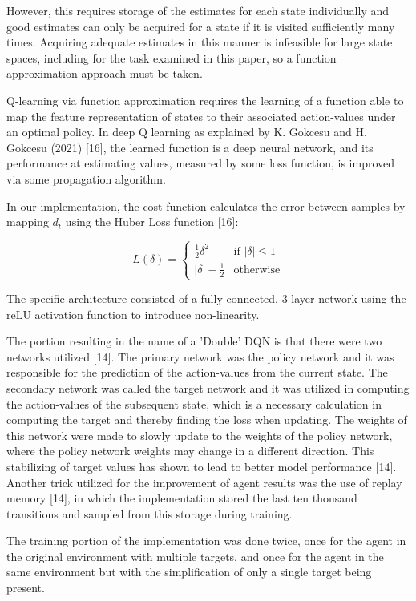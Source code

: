 \documentclass{article}
\begin{document}
	However, this requires storage of the estimates for each state individually and good estimates can only be acquired for a state if it is visited sufficiently many times. Acquiring adequate estimates in this manner is infeasible for large state spaces, including for the task examined in this paper, so a function approximation approach must be taken.
	
	Q-learning via function approximation requires the learning of a function able to map the feature representation of states to their associated action-values under an optimal policy. In deep Q learning as explained by K. Gokcesu and H. Gokcesu (2021) [16], the learned function is a deep neural network, and its performance at estimating values, measured by some loss function, is improved via some propagation algorithm.
	
	In our implementation, the cost function calculates the error between samples by mapping $d_{t}$ using the Huber Loss function [16]:
	
	\begin{equation}
		L(\delta)=
		\begin{cases}
			\frac{1}{2}\delta^{2} & \text{if  } |\delta| \leq 1\\
			|\delta| - \frac{1}{2} & \text{otherwise} 
		\end{cases}
	\end{equation}
	
	The specific architecture consisted of a fully connected, 3-layer network using the reLU activation function to introduce non-linearity.
	
	The portion resulting in the name of a 'Double' DQN is that there were two networks utilized [14]. The primary network was the policy network and it was responsible for the prediction of the action-values from the current state. The secondary network was called the target network and it was utilized in computing the action-values of the subsequent state, which is a necessary calculation in computing the target and thereby finding the loss when updating. The weights of this network were made to slowly update to the weights of the policy network, where the policy network weights may change in a different direction. This stabilizing of target values has shown to lead to better model performance [14]. Another trick utilized for the improvement of agent results was the use of replay memory [14], in which the implementation stored the last ten thousand transitions and sampled from this storage during training.
	
	The training portion of the implementation was done twice, once for the agent in the original environment with multiple targets, and once for the agent in the same environment but with the simplification of only a single target being present.
	
\end{document}

